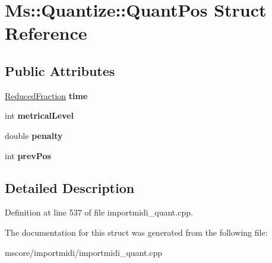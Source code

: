 \hypertarget{struct_ms_1_1_quantize_1_1_quant_pos}{}\section{Ms\+:\+:Quantize\+:\+:Quant\+Pos Struct Reference}
\label{struct_ms_1_1_quantize_1_1_quant_pos}
\subsection*{Public Attributes}
\begin{DoxyCompactItemize}
\item 
\mbox{\label{struct_ms_1_1_quantize_1_1_quant_pos_acaea94183cea3d19211f590bc3a0f2d0}} 
\hyperlink{class_ms_1_1_reduced_fraction}{Reduced\+Fraction} {\bfseries time}
\item 
\mbox{\label{struct_ms_1_1_quantize_1_1_quant_pos_a36c1714f357f837e7a55088861c64d95}} 
int {\bfseries metrical\+Level}
\item 
\mbox{\label{struct_ms_1_1_quantize_1_1_quant_pos_a11999e2f22291033824c270d74ab0cb0}} 
double {\bfseries penalty}
\item 
\mbox{\label{struct_ms_1_1_quantize_1_1_quant_pos_ad84df01ec597c2cf02b04952dc03943c}} 
int {\bfseries prev\+Pos}
\end{DoxyCompactItemize}


\subsection{Detailed Description}


Definition at line 537 of file importmidi\+\_\+quant.\+cpp.



The documentation for this struct was generated from the following file\+:\begin{DoxyCompactItemize}
\item 
mscore/importmidi/importmidi\+\_\+quant.\+cpp\end{DoxyCompactItemize}
